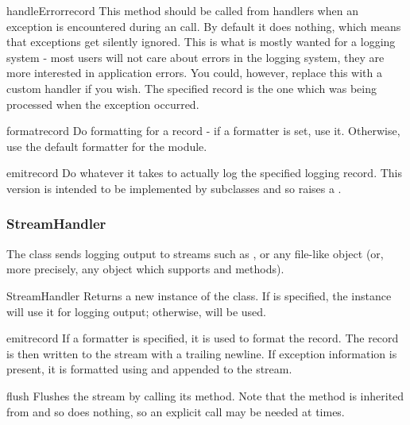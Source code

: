 \begin{methoddesc}{handleError}{record}
This method should be called from handlers when an exception is
encountered during an  call. By default it does nothing,
which means that exceptions get silently ignored. This is what is
mostly wanted for a logging system - most users will not care
about errors in the logging system, they are more interested in
application errors. You could, however, replace this with a custom
handler if you wish. The specified record is the one which was being
processed when the exception occurred.
\end{methoddesc}

\begin{methoddesc}{format}{record}
Do formatting for a record - if a formatter is set, use it.
Otherwise, use the default formatter for the module.
\end{methoddesc}

\begin{methoddesc}{emit}{record}
Do whatever it takes to actually log the specified logging record.
This version is intended to be implemented by subclasses and so
raises a .
\end{methoddesc}

\subsubsection{StreamHandler}

The  class sends logging output to streams such as
,  or any file-like object (or, more
precisely, any object which supports  and 
methods).

\begin{classdesc}{StreamHandler}{}
Returns a new instance of the  class. If  is
specified, the instance will use it for logging output; otherwise,
 will be used.
\end{classdesc}

\begin{methoddesc}{emit}{record}
If a formatter is specified, it is used to format the record.
The record is then written to the stream with a trailing newline.
If exception information is present, it is formatted using
 and appended to the stream.
\end{methoddesc}

\begin{methoddesc}{flush}{}
Flushes the stream by calling its  method. Note that
the  method is inherited from  and
so does nothing, so an explicit  call may be needed
at times.
\end{methoddesc}

